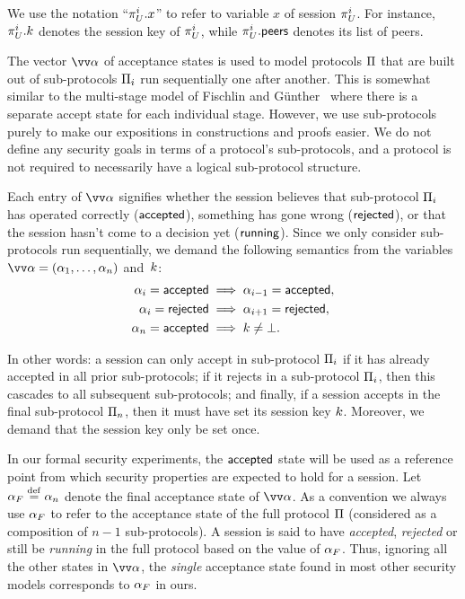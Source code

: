 We use the notation ``$\oracle[U][i].x$'' to refer to variable $x$ of session $\oracle[U][i]$.
For instance,
$\oracle[U][i].\key$ denotes the session key of $\oracle[U][i]$,
while $\oracle[U][i].\peers$ denotes its list of peers.



The vector $\vrunstate$ of acceptance states is used to model protocols $\mathrm{\Pi}$ that are built out of sub-protocols $\mathrm{\Pi}_i$ run sequentially one after another.
This is somewhat similar to the multi-stage model of Fischlin and Günther~\cite{CCS:FisGue14} where there is a separate accept state for each individual stage.
However,
we use sub-protocols purely to make our expositions in constructions and proofs easier.
We do not define any security goals in terms of a protocol's sub-protocols,
and a protocol is not required to necessarily have a logical sub-protocol structure.

Each entry of $\vrunstate$ signifies whether the session believes that sub-protocol $\mathrm{\Pi}_i$ has operated correctly
($\mathsf{accepted}$),
something has gone wrong ($\mathsf{rejected}$),
or that the session hasn't come to a decision yet ($\mathsf{running}$).
Since we only consider sub-protocols run sequentially,
we demand the following semantics from the variables $\vrunstate = (\runstate_1, \dotsc, \runstate_n)$ and~$k$:  
\begin{align}
	\alpha_i = \mathsf{accepted} &\implies \alpha_{i-1} = \mathsf{accepted}, \\
	\alpha_i = \mathsf{rejected} &\implies \alpha_{i+1} = \mathsf{rejected}, \label{eq:runstate:reject_consistency} \\
	\alpha_n = \mathsf{accepted} &\implies k \neq \bot . \label{eq:runstate:accepted_implies_k} 
\end{align}


In other words:
a session can only accept in sub-protocol $\mathrm{\Pi}_i$ if it has already accepted in all prior sub-protocols;
if it rejects in a sub-protocol $\mathrm{\Pi}_i$, then this cascades to all subsequent sub-protocols;
and finally,
if a session accepts in the final sub-protocol $\mathrm{\Pi}_n$,
then it must have set its session key $k$.
Moreover,
we demand that the session key only be set once.


In our formal security experiments,
the $\mathsf{accepted}$ state will be used as a reference point from which security properties are expected to hold for a session.
Let $\alpha_F \overset{\mathrm{def}}{=} \alpha_n$ denote the final acceptance state of $\vrunstate$.
As a convention we always use $\alpha_F$ to refer to the acceptance state of the full protocol $\mathrm{\Pi}$ (considered as a composition of $n-1$ sub-protocols).
A session is said to have \emph{accepted}, \emph{rejected}
or still be \emph{running} in the full protocol based on the value of $\alpha_F$.
Thus,
ignoring all the other states in $\vrunstate$,
the \emph{single} acceptance state found in most other security models corresponds to $\alpha_F$ in ours.

